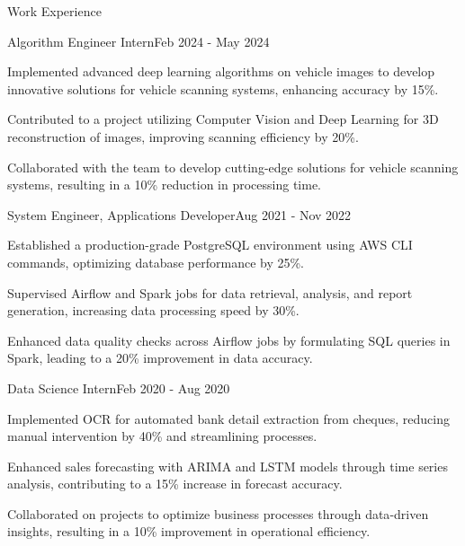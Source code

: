 \documentclass{resume} %
\begin{document}
    \begin{rSection}{Work Experience}
                    \begin{rSubsection}
                {Algorithm Engineer Intern}{Feb 2024 - May 2024}
                                    {}
                                {}
                                    \item Implemented advanced deep learning algorithms on vehicle images to develop innovative solutions for vehicle scanning systems, enhancing accuracy by 15\%.
                                    \item Contributed to a project utilizing Computer Vision and Deep Learning for 3D reconstruction of images, improving scanning efficiency by 20\%.
                                    \item Collaborated with the team to develop cutting{-}edge solutions for vehicle scanning systems, resulting in a 10\% reduction in processing time.
                            \end{rSubsection}
                    \begin{rSubsection}
                {System Engineer, Applications Developer}{Aug 2021 - Nov 2022}
                                    {}
                                {}
                                    \item Established a production{-}grade PostgreSQL environment using AWS CLI commands, optimizing database performance by 25\%.
                                    \item Supervised Airflow and Spark jobs for data retrieval, analysis, and report generation, increasing data processing speed by 30\%.
                                    \item Enhanced data quality checks across Airflow jobs by formulating SQL queries in Spark, leading to a 20\% improvement in data accuracy.
                            \end{rSubsection}
                    \begin{rSubsection}
                {Data Science Intern}{Feb 2020 - Aug 2020}
                                    {}
                                {}
                                    \item Implemented OCR for automated bank detail extraction from cheques, reducing manual intervention by 40\% and streamlining processes.
                                    \item Enhanced sales forecasting with ARIMA and LSTM models through time series analysis, contributing to a 15\% increase in forecast accuracy.
                                    \item Collaborated on projects to optimize business processes through data{-}driven insights, resulting in a 10\% improvement in operational efficiency.
                            \end{rSubsection}
            \end{rSection}
\end{document}
